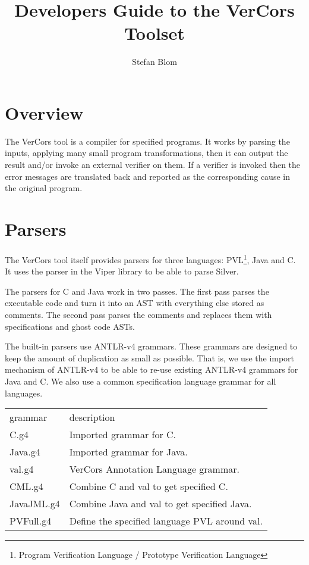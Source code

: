 \documentclass{report}
\author{Stefan Blom}
\title{Developers Guide to the VerCors Toolset}
\begin{document}
\maketitle

\tableofcontents

\chapter{Overview}

The VerCors tool is a compiler for specified programs. It works by 
parsing the inputs, applying many small program transformations,
then it can output the result and/or invoke an external verifier on them.
If a verifier is invoked then the error messages are translated back
and reported as the corresponding cause in the original program.



\chapter{Parsers}

The VerCors tool itself provides parsers for three languages:
PVL\footnote{Program Verification Language / Prototype Verification Language}, Java and C.
It uses the parser in the Viper library to be able to parse Silver.

The parsers for C and Java work in two passes. The first pass parses the executable code
and turn it into an AST with everything else stored as comments. The second pass
parses the comments and replaces them with specifications and ghost code ASTs.

The built-in parsers use ANTLR-v4 grammars. These grammars are designed
to keep the amount of duplication as small as possible. That is, we use
the import mechanism of ANTLR-v4 to be able to re-use
existing ANTLR-v4 grammars for Java and C. We also use a common specification
language grammar for all languages.

\par\noindent\begin{tabularx}{\textwidth}{lX}
grammar & description
\\
C.g4 & Imported grammar for C.
\\
Java.g4 & Imported grammar for Java.
\\
val.g4 & VerCors Annotation Language grammar.
\\
CML.g4 & Combine C and val to get specified C.
\\
JavaJML.g4 & Combine Java and val to get specified Java.
\\
PVFull.g4 & Define the specified language PVL around val.
\end{tabularx}
\end{document}
